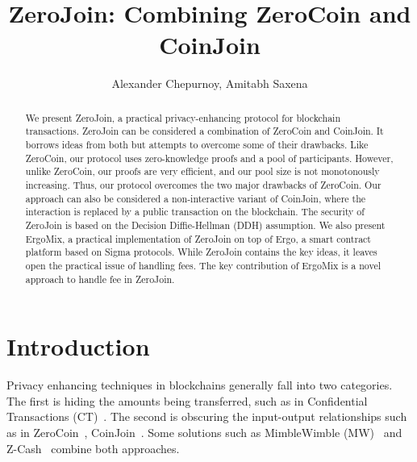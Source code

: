 \documentclass[runningheads]{llncs}
\newcommand{\mixname}{ErgoMix\xspace}
\begin{document}
\newcommand{\algname}{ZeroJoin\xspace}
\title{\algname: Combining ZeroCoin and CoinJoin}

\author{Alexander Chepurnoy, Amitabh Saxena}


\maketitle

\begin{abstract}

We present \algname, a practical privacy-enhancing protocol for blockchain transactions. \algname can be considered a combination of ZeroCoin and CoinJoin. It borrows ideas from both but attempts to overcome some of their drawbacks.
Like ZeroCoin, our protocol uses zero-knowledge proofs and a pool of
participants. However, unlike ZeroCoin, our proofs are very efficient, and our pool size is not monotonously increasing.
Thus, our protocol overcomes the two major drawbacks of ZeroCoin. Our approach can also be considered a non-interactive variant of CoinJoin, where the interaction is replaced by a public transaction on the blockchain. The security of \algname is based on the Decision Diffie-Hellman (DDH) assumption. 
We also present \mixname, a practical implementation of \algname on top of Ergo, a smart contract platform based on Sigma protocols. While \algname contains the key ideas, it leaves open the practical issue of handling fees. The key contribution of \mixname is a novel approach to handle fee in \algname. 

\end{abstract}

\section{Introduction}
\label{intro}

Privacy enhancing techniques in blockchains generally fall into two categories. The first is hiding the amounts being transferred, such as in Confidential Transactions (CT)~\cite{ct}. The second is obscuring the input-output relationships such as in ZeroCoin~\cite{zerocoin}, CoinJoin~\cite{coinjoin}. Some solutions such as MimbleWimble (MW)~\cite{mw} and Z-Cash~\cite{zcash,zcash1} combine both approaches.
\end{document}
